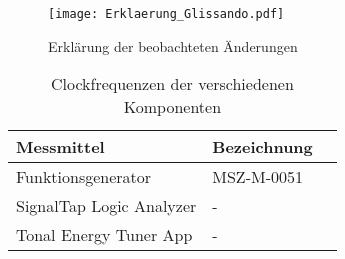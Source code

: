 \begin{figure}[h!]
	\centering
	\texttt{[image: Erklaerung\_Glissando.pdf]}
	\caption{Erklärung der beobachteten Änderungen} 
	\label{img:Erklärung Glissando}
\end{figure} 

\begin{table}[H]
	\centering
	\caption{Clockfrequenzen der verschiedenen Komponenten}
	\label{tab:clocks}
	\begin{tabular}{l|l|l}
		\textbf{Messmittel} & \textbf{Bezeichnung} \\
		\hline\hline
		Funktionsgenerator & MSZ-M-0051   \\ \hline
		SignalTap Logic Analyzer & -    \\ \hline
		Tonal Energy Tuner App &  -   \\ \hline
		
	\end{tabular}
\end{table}

